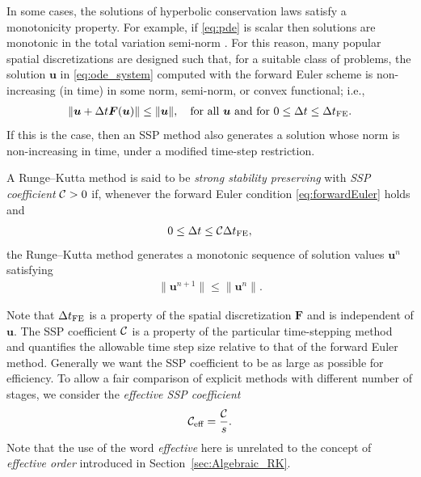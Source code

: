 \documentclass{siamltex}  %
\begin{document}
In some cases, the solutions of hyperbolic conservation laws satisfy a 
monotonicity property. For example, if \eqref{eq:pde} is scalar then solutions 
are monotonic in the total variation semi-norm \cite{Ketcheson2008}.
For this reason, many popular spatial discretizations are designed such 
that, for a suitable class of problems, the solution $\bm{u}$ in 
\eqref{eq:ode_system} computed with the forward Euler scheme is
non-increasing (in time) in some norm, semi-norm, or convex functional; i.e.,
\begin{align}\label{eq:forwardEuler}
    \|\bm{u} + \Delta t\bm{F}(\bm{u})\| \le \|\bm{u}\|, \quad \text{for all } \bm{u} \text{ and for } 0 \le \Delta t \le \Delta t_{\textnormal{FE}}.
\end{align}
If this is the case, then an SSP method also generates a solution whose norm is
non-increasing in time, under a modified time-step restriction.
\begin{definition}
	A Runge--Kutta method is said to be \emph{strong stability preserving} with
	\emph{SSP coefficient} $\mathcal{C} > 0$ if, whenever the forward Euler condition
	\eqref{eq:forwardEuler} holds and 
	\begin{align*}
		0 \leq \Delta t \leq \mathcal{C} \Delta t_{\textnormal{FE}},
	\end{align*}
	the Runge--Kutta method generates a monotonic sequence of solution values $\bm{u}^n$ satisfying
	\begin{align*}
  		\|\bm{u}^{n+1}\| \le \|\bm{u}^n\|.
	\end{align*}
\end{definition}

Note that $\Delta t_{\textnormal{FE}}$ is a property of the spatial discretization $\bm{F}$
and is independent of $\bm{u}$.
The SSP coefficient $\mathcal{C}$ is a property of the particular
time-stepping method and quantifies the allowable time step size relative 
to that of the forward Euler method.
Generally we want the SSP coefficient to be as large as possible for efficiency.
To allow a fair comparison of explicit methods with different number of stages, 
we consider the \emph{effective SSP coefficient}
\begin{align*}
	\mathcal{C}_{\textnormal{eff}} = \frac{\mathcal{C}}{s}.
\end{align*}
Note that the use of the word \emph{effective} here is unrelated to the 
concept of \emph{effective order} introduced in Section~\ref{sec:Algebraic_RK}.
\end{document}
